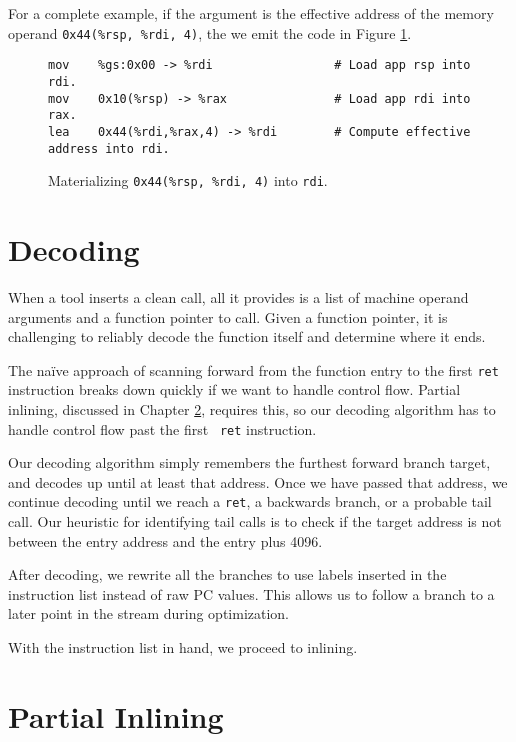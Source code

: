 For a complete example, if the argument is the effective address of the memory
operand {\tt 0x44(\%rsp, \%rdi, 4)}, the we emit the code in Figure
\ref{fig:arg_mat_lea}.

\begin{figure}
\begin{verbatim}
mov    %gs:0x00 -> %rdi                 # Load app rsp into rdi.
mov    0x10(%rsp) -> %rax               # Load app rdi into rax.
lea    0x44(%rdi,%rax,4) -> %rdi        # Compute effective address into rdi.
\end{verbatim}
\caption{Materializing {\tt 0x44(\%rsp, \%rdi, 4)} into {\tt rdi}.}
\label{fig:arg_mat_lea}
\end{figure}

\section{Decoding}
\label{sec:decoding}

When a tool inserts a clean call, all it provides is a list of machine operand
arguments and a function pointer to call.  Given a function pointer, it is
challenging to reliably decode the function itself and determine where it ends.

The na\"ive approach of scanning forward from the function entry to the first
{\tt ret} instruction breaks down quickly if we want to handle control flow.
Partial inlining, discussed in Chapter \ref{sec:partial_inlining}, requires
this, so our decoding algorithm has to handle control flow past the first {\tt
ret} instruction.

Our decoding algorithm simply remembers the furthest forward branch target, and
decodes up until at least that address.  Once we have passed that address, we
continue decoding until we reach a {\tt ret}, a backwards branch, or a probable
tail call.  Our heuristic for identifying tail calls is to check if the target
address is not between the entry address and the entry plus 4096.

After decoding, we rewrite all the branches to use labels inserted in the
instruction list instead of raw PC values.  This allows us to follow a branch to
a later point in the stream during optimization.

With the instruction list in hand, we proceed to inlining.


\section{Partial Inlining}
\label{sec:partial_inlining}

